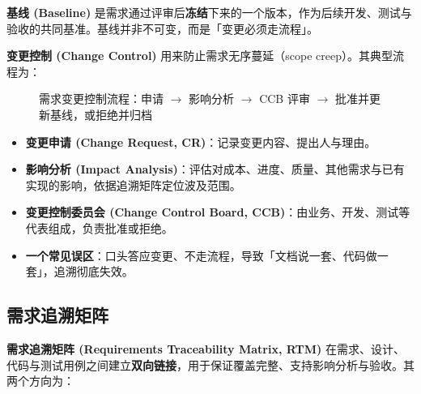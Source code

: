 \textbf{基线 (Baseline)} 是需求通过评审后\textbf{冻结}下来的一个版本，作为后续开发、测试与验收的共同基准。基线并非不可变，而是「变更必须走流程」。

\textbf{变更控制 (Change Control)} 用来防止需求无序蔓延（scope creep）。其典型流程为：

\begin{figure}[H]
\centering
{}
\caption{需求变更控制流程：申请 $\to$ 影响分析 $\to$ CCB 评审 $\to$ 批准并更新基线，或拒绝并归档}
\end{figure}

\begin{itemize}
    \item \textbf{变更申请 (Change Request, CR)}：记录变更内容、提出人与理由。
    \item \textbf{影响分析 (Impact Analysis)}：评估对成本、进度、质量、其他需求与已有实现的影响，依据追溯矩阵定位波及范围。
    \item \textbf{变更控制委员会 (Change Control Board, CCB)}：由业务、开发、测试等代表组成，负责批准或拒绝。
    \item \textbf{一个常见误区}：口头答应变更、不走流程，导致「文档说一套、代码做一套」，追溯彻底失效。
\end{itemize}

\subsection{需求追溯矩阵}

\textbf{需求追溯矩阵 (Requirements Traceability Matrix, RTM)} 在需求、设计、代码与测试用例之间建立\textbf{双向链接}，用于保证覆盖完整、支持影响分析与验收。其两个方向为：

